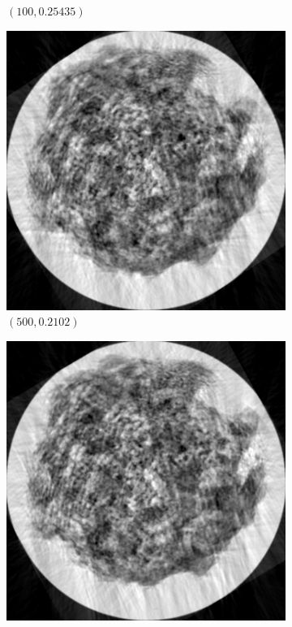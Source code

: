 \documentclass[a4paper, landscape]{article}
\begin{document}
\begin{figure}[H]
\begin{subfigure}{0.13\linewidth}
		\caption{$(100, 0.25435)$}
	\end{subfigure}
	\begin{subfigure}{0.13\linewidth}
		\centering
		\includegraphics[width=\linewidth]{results/cryoem, N = 500.png}
		\caption{$(500, 0.2102)$}
	\end{subfigure}
	\begin{subfigure}{0.13\linewidth}
		\centering
		\includegraphics[width=\linewidth]{results/cryoem, N = 1000.png}

\end{subfigure}
\end{figure}
\end{document}
